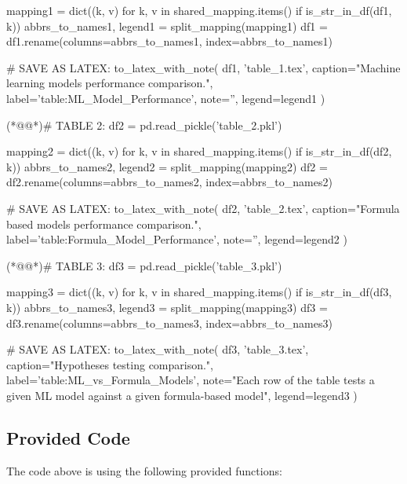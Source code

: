 \documentclass[11pt]{article}
\begin{document}
\begin{python}
mapping1 = dict((k, v) for k, v in shared_mapping.items() if is_str_in_df(df1, k)) 
abbrs_to_names1, legend1 = split_mapping(mapping1)
df1 = df1.rename(columns=abbrs_to_names1, index=abbrs_to_names1)

# SAVE AS LATEX:
to_latex_with_note(
    df1, 'table_1.tex',
    caption="Machine learning models performance comparison.", 
    label='table:ML_Model_Performance',
    note='',
    legend=legend1
)

(*@@*)# TABLE 2:
df2 = pd.read_pickle('table_2.pkl')

mapping2 = dict((k, v) for k, v in shared_mapping.items() if is_str_in_df(df2, k)) 
abbrs_to_names2, legend2 = split_mapping(mapping2)
df2 = df2.rename(columns=abbrs_to_names2, index=abbrs_to_names2)

# SAVE AS LATEX:
to_latex_with_note(
    df2, 'table_2.tex', 
    caption="Formula based models performance comparison.", 
    label='table:Formula_Model_Performance',
    note='',
    legend=legend2
)

(*@@*)# TABLE 3:
df3 = pd.read_pickle('table_3.pkl')

mapping3 = dict((k, v) for k, v in shared_mapping.items() if is_str_in_df(df3, k)) 
abbrs_to_names3, legend3 = split_mapping(mapping3)
df3 = df3.rename(columns=abbrs_to_names3, index=abbrs_to_names3)

# SAVE AS LATEX:
to_latex_with_note(
    df3, 'table_3.tex',
    caption="Hypotheses testing comparison.", 
    label='table:ML_vs_Formula_Models',
    note="Each row of the table tests a given ML model against a given formula-based model",
    legend=legend3
)

\end{python}

\subsection{Provided Code}
The code above is using the following provided functions:
\end{document}

